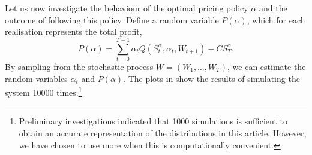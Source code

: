 \documentclass{rsproca_new}
\theoremstyle{definition}
\begin{document}
Let us now investigate the behaviour of the optimal pricing policy
$\alpha$ and
the outcome of following this policy.
Define a random variable $P(\alpha)$, which for each realisation
represents the total profit,
\begin{equation}
  P(\alpha) = \sum_{t=0}^{T-1}\alpha_tQ(S_t^\alpha,\alpha_t,W_{t+1}) - CS_T^\alpha.
\end{equation}
By sampling from the stochastic process $W=(W_1,\dots,W_T)$, we can
estimate the random variables $\alpha_t$ and $P(\alpha)$.
The plots in  show the results of
simulating the system \num{10000} times.\footnote{Preliminary
  investigations indicated that \num{1000}
  simulations is sufficient to obtain an accurate representation of
  the distributions in this article. However, we have chosen to use
  more when this is computationally convenient.
}
\end{document}
